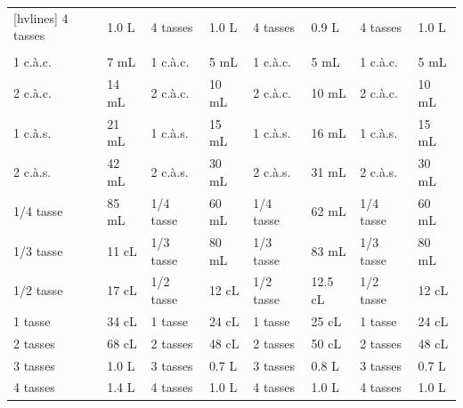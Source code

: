 \begin{table}
\begin{NiceTabular}{*{8}{m{.1\textwidth}}}[hvlines]
		4 tasses                     & 1.0 L & 4 tasses                              & 1.0 L & 4 tasses                              & 0.9 L   & 4 tasses                                & 1.0 L \\
		 &       &  &       &  &         &          \\
		1 c.à.c.                     & 7 mL  & 1 c.à.c.                              & 5 mL  & 1 c.à.c.                              & 5 mL    & 1 c.à.c.                                & 5 mL  \\
		2 c.à.c.                     & 14 mL & 2 c.à.c.                              & 10 mL & 2 c.à.c.                              & 10 mL   & 2 c.à.c.                                & 10 mL \\
		1 c.à.s.                     & 21 mL & 1 c.à.s.                              & 15 mL & 1 c.à.s.                              & 16 mL   & 1 c.à.s.                                & 15 mL \\
		2 c.à.s.                     & 42 mL & 2 c.à.s.                              & 30 mL & 2 c.à.s.                              & 31 mL   & 2 c.à.s.                                & 30 mL \\
		1/4 tasse                    & 85 mL & 1/4 tasse                             & 60 mL & 1/4 tasse                             & 62 mL   & 1/4 tasse                               & 60 mL \\
		1/3 tasse                    & 11 cL & 1/3 tasse                             & 80 mL & 1/3 tasse                             & 83 mL   & 1/3 tasse                               & 80 mL \\
		1/2 tasse                    & 17 cL & 1/2 tasse                             & 12 cL & 1/2 tasse                             & 12.5 cL & 1/2 tasse                               & 12 cL \\
		1 tasse                      & 34 cL & 1 tasse                               & 24 cL & 1 tasse                               & 25 cL   & 1 tasse                                 & 24 cL \\
		2 tasses                     & 68 cL & 2 tasses                              & 48 cL & 2 tasses                              & 50 cL   & 2 tasses                                & 48 cL \\
		3 tasses                     & 1.0 L & 3 tasses                              & 0.7 L & 3 tasses                              & 0.8 L   & 3 tasses                                & 0.7 L \\
		4 tasses                     & 1.4 L & 4 tasses                              & 1.0 L & 4 tasses                              & 1.0 L   & 4 tasses                                & 1.0 L \\
	\end{NiceTabular}
\end{table}

